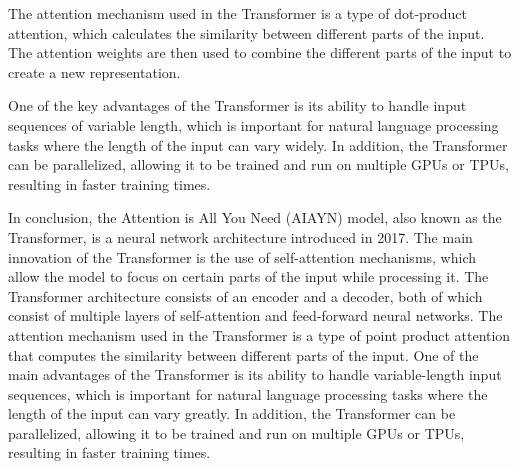 The attention mechanism used in the Transformer is a type of dot-product attention, which calculates the similarity between different parts of the input.
The attention weights are then used to combine the different parts of the input to create a new representation.

One of the key advantages of the Transformer is its ability to handle input sequences of variable length, which is important for natural language processing tasks where the length of the input can vary widely.
In addition, the Transformer can be parallelized, allowing it to be trained and run on multiple GPUs or TPUs, resulting in faster training times.

In conclusion, the Attention is All You Need (AIAYN) model, also known as the Transformer, is a neural network architecture introduced in 2017.
The main innovation of the Transformer is the use of self-attention mechanisms, which allow the model to focus on certain parts of the input while processing it.
The Transformer architecture consists of an encoder and a decoder, both of which consist of multiple layers of self-attention and feed-forward neural networks.
The attention mechanism used in the Transformer is a type of point product attention that computes the similarity between different parts of the input.
One of the main advantages of the Transformer is its ability to handle variable-length input sequences, which is important for natural language processing tasks where the length of the input can vary greatly. 
In addition, the Transformer can be parallelized, allowing it to be trained and run on multiple GPUs or TPUs, resulting in faster training times.

